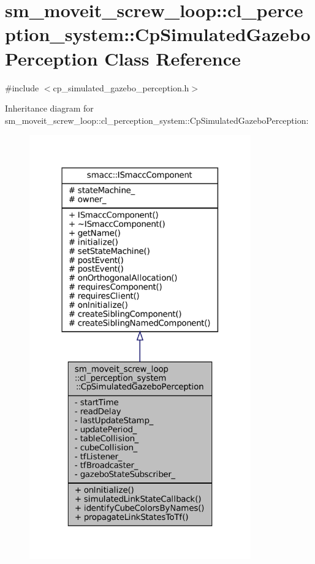 \hypertarget{classsm__moveit__screw__loop_1_1cl__perception__system_1_1CpSimulatedGazeboPerception}{}\section{sm\+\_\+moveit\+\_\+screw\+\_\+loop\+:\+:cl\+\_\+perception\+\_\+system\+:\+:Cp\+Simulated\+Gazebo\+Perception Class Reference}
\label{classsm__moveit__screw__loop_1_1cl__perception__system_1_1CpSimulatedGazeboPerception}


{\ttfamily \#include $<$cp\+\_\+simulated\+\_\+gazebo\+\_\+perception.\+h$>$}



Inheritance diagram for sm\+\_\+moveit\+\_\+screw\+\_\+loop\+:\+:cl\+\_\+perception\+\_\+system\+:\+:Cp\+Simulated\+Gazebo\+Perception\+:
\nopagebreak
\begin{figure}[H]
\begin{center}
\leavevmode
\includegraphics[width=271pt]{classsm__moveit__screw__loop_1_1cl__perception__system_1_1CpSimulatedGazeboPerception__inherit__graph}
\end{center}
\end{figure}


